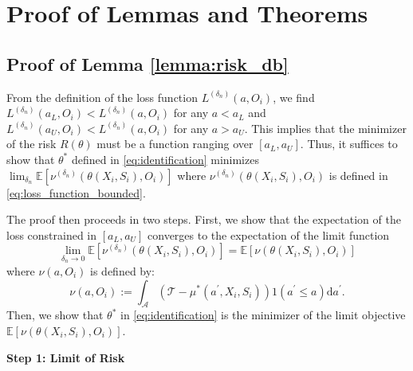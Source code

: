 \documentclass[12pt]{article}
\newcommand{\E}{\mathbb{E}}
\begin{document}
\section{Proof of Lemmas and Theorems}\label{sec:proof}

\subsection{Proof of Lemma \ref{lemma:risk_db}}



From the definition of the loss function $L^{({\delta_n})}(a,O_i)$, we find $L^{({\delta_n})}(a_L,O_i)< L^{({\delta_n})}(a,O_i)$ for any $a< a_L$ and $L^{({\delta_n})}(a_U,O_i)< L^{({\delta_n})}(a,O_i)$ for any $a> a_U$. This implies that the minimizer of the risk $R(\theta)$ must be a function ranging over $[a_L,a_U]$. Thus, it suffices to show that $\theta^*$ defined in \eqref{eq:identification} minimizes $\lim_{{\delta_n}}\E[\nu^{(\delta_n)}(\theta(X_i,S_i),O_i)]$ where $\nu^{(\delta_n)}(\theta(X_i,S_i),O_i)$ is defined in \eqref{eq:loss_function_bounded}. 

The proof then proceeds in two steps. First, we show that the expectation of the loss constrained in $[a_L,a_U]$ converges to the expectation of the limit function$$\lim_{{\delta_n\rightarrow 0}}\E[\nu^{(\delta_n)}(\theta(X_i,S_i),O_i)] = \E[\nu(\theta(X_i,S_i),O_i)]$$
where $\nu(a,O_i)$ is defined by:
$$\nu(a,O_i):= \int_{\mathcal{A}} \left( \mathcal{T} - \mu^*(a^\prime, X_i, S_i) \right) 1(a^\prime \leq a) \mathrm{d}a^\prime.$$
Then, we show that $\theta^*$ in \eqref{eq:identification} is the minimizer of the limit objective $\E[\nu(\theta(X_i,S_i),O_i)]$.

\noindent \textbf{Step 1: Limit of Risk}
\end{document}
